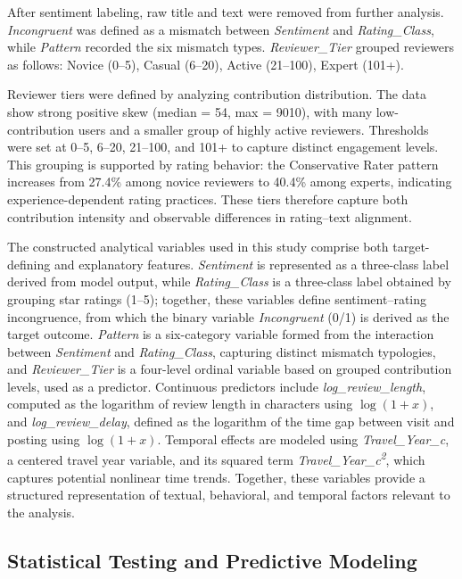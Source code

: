 \documentclass[conference]{IEEEtran}
\begin{document}
After sentiment labeling, raw title and text were removed from further
analysis. \textit{Incongruent} was defined as a mismatch between
\textit{Sentiment} and \textit{Rating\_Class}, while \textit{Pattern} recorded
the six mismatch types. \textit{Reviewer\_Tier} grouped reviewers as follows: Novice (0--5), Casual (6--20), Active (21--100), Expert (101+).

Reviewer tiers were defined by analyzing contribution distribution. The data show strong positive skew (median = 54, max = 9010), with many low-contribution users and a smaller group of highly active reviewers. Thresholds were set at 0–5, 6–20, 21–100, and 101+ to capture distinct engagement levels. This grouping is supported by rating behavior: the Conservative Rater pattern increases from 27.4\% among novice reviewers to 40.4\% among experts, indicating experience-dependent rating practices. These tiers therefore capture both contribution intensity and observable differences in rating–text alignment.


The constructed analytical variables used in this study comprise both target-defining and explanatory features. \textit{Sentiment} is represented as a three-class label derived from model output, while \textit{Rating\_Class} is a three-class label obtained by grouping star ratings (1--5); together, these variables define sentiment–rating incongruence, from which the binary variable \textit{Incongruent} (0/1) is derived as the target outcome. \textit{Pattern} is a six-category variable formed from the interaction between \textit{Sentiment} and \textit{Rating\_Class}, capturing distinct mismatch typologies, and \textit{Reviewer\_Tier} is a four-level ordinal variable based on grouped contribution levels, used as a predictor. Continuous predictors include \textit{log\_review\_length}, computed as the logarithm of review length in characters using $\log(1+x)$, and \textit{log\_review\_delay}, defined as the logarithm of the time gap between visit and posting using $\log(1+x)$. Temporal effects are modeled using \textit{Travel\_Year\_c}, a centered travel year variable, and its squared term \textit{Travel\_Year\_c\textsuperscript{2}}, which captures potential nonlinear time trends. Together, these variables provide a structured representation of textual, behavioral, and temporal factors relevant to the analysis.



\subsection{Statistical Testing and Predictive Modeling}
\end{document}
